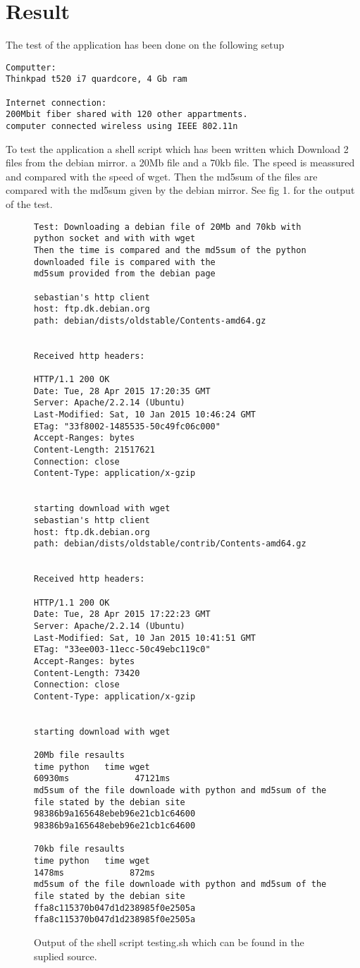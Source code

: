 \documentclass[a4paper,12pt,danish]{dnacm} %
\begin{document}
\section{Result}
The test of the application has been done on the following setup
\begin{lstlisting}
Computter:
Thinkpad t520 i7 quardcore, 4 Gb ram 

Internet connection:
200Mbit fiber shared with 120 other appartments.
computer connected wireless using IEEE 802.11n
\end{lstlisting}

To test the application a shell script which has been written which Download 2
files from the debian mirror. a 20Mb file and a 70kb file. The speed is meassured
and compared with the speed of wget. Then the md5sum of the files are compared
with the md5sum given by the debian mirror. See fig 1. for the output of the
test.

\begin{figure*}
\centering
\begin{lstlisting}
Test: Downloading a debian file of 20Mb and 70kb with python socket and with with wget
Then the time is compared and the md5sum of the python downloaded file is compared with the 
md5sum provided from the debian page

sebastian's http client
host: ftp.dk.debian.org
path: debian/dists/oldstable/Contents-amd64.gz


Received http headers:

HTTP/1.1 200 OK
Date: Tue, 28 Apr 2015 17:20:35 GMT
Server: Apache/2.2.14 (Ubuntu)
Last-Modified: Sat, 10 Jan 2015 10:46:24 GMT
ETag: "33f8002-1485535-50c49fc06c000"
Accept-Ranges: bytes
Content-Length: 21517621
Connection: close
Content-Type: application/x-gzip


starting download with wget
sebastian's http client
host: ftp.dk.debian.org
path: debian/dists/oldstable/contrib/Contents-amd64.gz


Received http headers:

HTTP/1.1 200 OK
Date: Tue, 28 Apr 2015 17:22:23 GMT
Server: Apache/2.2.14 (Ubuntu)
Last-Modified: Sat, 10 Jan 2015 10:41:51 GMT
ETag: "33ee003-11ecc-50c49ebc119c0"
Accept-Ranges: bytes
Content-Length: 73420
Connection: close
Content-Type: application/x-gzip


starting download with wget

20Mb file resaults
time python   time wget
60930ms             47121ms  
md5sum of the file downloade with python and md5sum of the file stated by the debian site
98386b9a165648ebeb96e21cb1c64600
98386b9a165648ebeb96e21cb1c64600

70kb file resaults
time python   time wget
1478ms             872ms  
md5sum of the file downloade with python and md5sum of the file stated by the debian site
ffa8c115370b047d1d238985f0e2505a
ffa8c115370b047d1d238985f0e2505a
\end{lstlisting}
\caption{Output of the shell script testing.sh which can be found in the
suplied source.}
  \label{fig:videocomparison}

\end{figure*}
\end{document}
